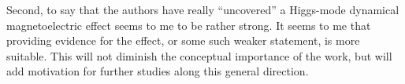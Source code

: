 Second, to say that the authors have really ``uncovered'' a Higgs-mode dynamical magnetoelectric effect seems to me to be rather strong. It seems to me that providing evidence for the effect, or some such weaker statement, is more suitable. This will not diminish the conceptual importance of the work, but will add motivation for further studies along this general direction.
